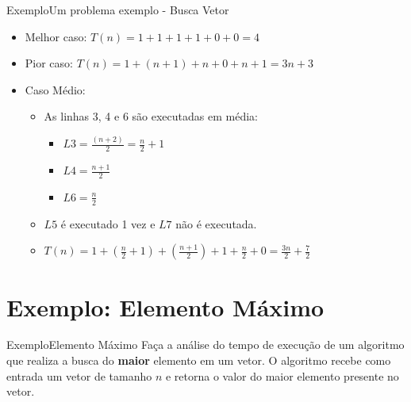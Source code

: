 \documentclass[aspectratio=169]{beamer}
\begin{document}
\begin{frame}[fragile]{Exemplo}{Um problema exemplo - Busca Vetor}
\begin{itemize}
\item Melhor caso: $T(n) = 1 + 1 + 1 + 1 + 0 + 0= 4$
\item Pior caso: $T(n) = 1 + (n + 1) + n + 0 + n + 1 = 3n + 3$
\item Caso Médio:
\begin{itemize}
\item As linhas 3, 4 e 6 são executadas em média:
\begin{itemize}
\item $L3 = \frac{(n + 2)}{2} = \frac{n}{2} + 1$
\item $L4 = \frac{n+1}{2}$
\item $L6 = \frac{n}{2}$
\end{itemize}
\item $L5$ é executado 1 vez e $L7$ não é executada.
\item $T(n) = 1 + (\frac{n}{2} + 1) + (\frac{n+1}{2}) + 1 + \frac{n}{2} + 0 = \frac{3n}{2} + \frac{7}{2}$
\end{itemize}
\end{itemize}
\end{frame}

\section{Exemplo: Elemento Máximo}

\begin{frame}{Exemplo}{Elemento Máximo}
Faça a análise do tempo de execução de um algoritmo que realiza a busca do {\bf maior} elemento em um vetor. O algoritmo recebe como entrada um vetor de tamanho $n$ e retorna o valor do maior elemento presente no vetor.
\end{frame}

\end{document}
